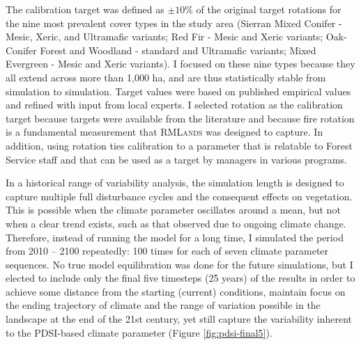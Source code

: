 The calibration target was defined as $\pm 10$\% of the original target rotations for the nine most prevalent cover types in the study area (Sierran Mixed Conifer - Mesic, Xeric, and Ultramafic variants; Red Fir - Mesic and Xeric variants; Oak-Conifer Forest and Woodland - standard and Ultramafic variants; Mixed Evergreen - Mesic and Xeric variants). I focused on these nine types because they all extend across more than 1,000 ha, and are thus statistically stable from simulation to simulation. Target values were based on published empirical values and refined with input from local experts\citep{Landfire2007,Mallek2013}. I selected rotation as the calibration target because targets were available from the literature and because fire rotation is a fundamental measurement that \textsc{RMLands} was designed to capture. In addition, using rotation ties calibration to a parameter that is relatable to Forest Service staff and that can be used as a target by managers in various programs.

In a historical range of variability analysis, the simulation length is designed to capture multiple full disturbance cycles and the consequent effects on vegetation. This is possible when the climate parameter oscillates around a mean, but not when a clear trend exists, such as that observed due to ongoing climate change. Therefore, instead of running the model for a long time, I simulated the period from 2010 -- 2100 repeatedly: 100 times for each of seven climate parameter sequences. No true model equilibration was done for the future simulations, but I elected to include only the final five timesteps (25 years) of the results in order to achieve some distance from the starting (current) conditions, maintain focus on the ending trajectory of climate and the range of variation possible in the landscape at the end of the 21st century, yet still capture the variability inherent to the PDSI-based climate parameter (Figure \ref{fig:pdsi-final5}).





